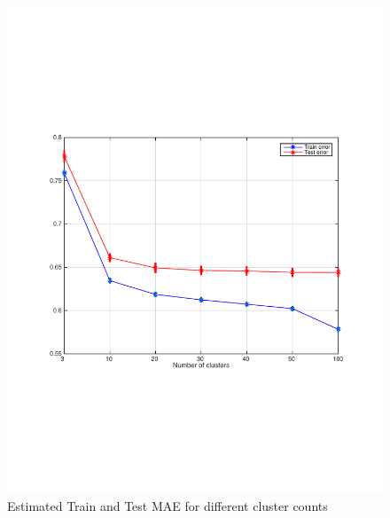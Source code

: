 \begin{figure}[h]
  \centering
  \begin{minipage}[b]{0.42\textwidth}
   \includegraphics[width=\textwidth]{figures/kmeans_train_test.pdf}
    \caption{Estimated Train and Test MAE for different cluster counts}
    \label{fig:kmeans_final}
  \end{minipage}
  \hfill
  \begin{minipage}[b]{0.45\textwidth}

\end{minipage}
\end{figure}
